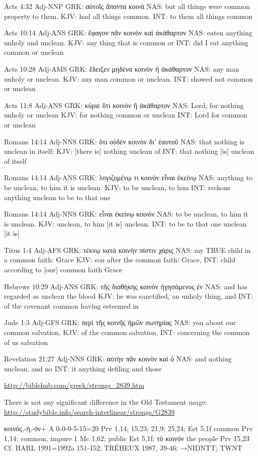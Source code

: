 \documentclass[11pt]{article}
\begin{document}
\begin{thebibliography}{37}
\begin{greek}
Acts 4:32 Adj-NNP
GRK: αὐτοῖς ἅπαντα κοινά 
NAS: but all things were common property to them.
KJV: had all things common.
INT: to them all things common

Acts 10:14 Adj-ANS
GRK: ἔφαγον πᾶν κοινὸν καὶ ἀκάθαρτον
NAS: eaten anything unholy and unclean.
KJV: any thing that is common or
INT: did I eat anything common or unclean

Acts 10:28 Adj-AMS
GRK: ἔδειξεν μηδένα κοινὸν ἢ ἀκάθαρτον
NAS: any man unholy or unclean.
KJV: any man common or unclean.
INT: showed not common or unclean

Acts 11:8 Adj-ANS
GRK: κύριε ὅτι κοινὸν ἢ ἀκάθαρτον
NAS: Lord, for nothing unholy or unclean
KJV: for nothing common or unclean
INT: Lord for common or unclean

Romans 14:14 Adj-NNS
GRK: ὅτι οὐδὲν κοινὸν δι' ἑαυτοῦ
NAS: that nothing is unclean in itself;
KJV: [there is] nothing unclean of
INT: that nothing [is] unclean of itself

Romans 14:14 Adj-ANS
GRK: λογιζομένῳ τι κοινὸν εἶναι ἐκείνῳ
NAS: anything to be unclean, to him it is unclean.
KJV: to be unclean, to him
INT: reckons anything unclean to be to that one

Romans 14:14 Adj-NNS
GRK: εἶναι ἐκείνῳ κοινόν 
NAS: to be unclean, to him it is unclean.
KJV: unclean, to him [it is] unclean.
INT: to be to that one unclean [it is]

Titus 1:4 Adj-AFS
GRK: τέκνῳ κατὰ κοινὴν πίστιν χάρις
NAS: my TRUE child in a common faith: Grace
KJV: son after the common faith: Grace,
INT: child according to [our] common faith Grace

Hebrews 10:29 Adj-ANS
GRK: τῆς διαθήκης κοινὸν ἡγησάμενος ἐν
NAS: and has regarded as unclean the blood
KJV: he was sanctified, an unholy thing, and
INT: of the covenant common having esteemed in

Jude 1:3 Adj-GFS
GRK: περὶ τῆς κοινῆς ἡμῶν σωτηρίας
NAS: you about our common salvation,
KJV: of the common salvation,
INT: concerning the common of us salvation

Revelation 21:27 Adj-NNS
GRK: αὐτὴν πᾶν κοινὸν καὶ ὁ
NAS: and nothing unclean, and no
INT: it anything defiling and those
\end{greek}
\url{http://biblehub.com/greek/strongs_2839.htm}

There is not any significant difference in the Old Testament usage:
\url{http://studybible.info/search-interlinear/strongs/G2839}


\begin{greek}
κοινός,-ή,-όν+ A 0-0-0-5-15=20
Prv 1,14; 15,23; 21,9; 25,24; Est 5,1f
common Prv 1,14; common, impure 1 Mc 1,62; public Est 5,1f; τὸ κοινόν the people Prv 15,23
Cf. HARL 1991=1992a 151-152; TRÉHEUX 1987, 39-46; →NIDNTT; TWNT 
\end{greek}


\end{thebibliography}
\end{document}
